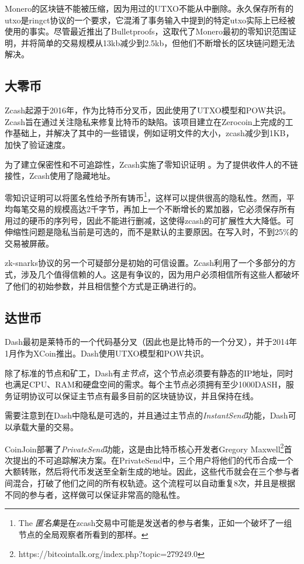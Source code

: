 \documentclass[8pt,fleqn,openany]{book}
\begin{document}
\begin{CJK*}{UTF8}{gbsn}
{Monero的区块链不能被压缩，因为用过的UTXO不能从中删除。永久保存所有的utxo是ringct协议的一个要求，它混淆了事务输入中提到的特定utxo实际上已经被使用的事实。尽管最近推出了Bulletproofs\cite{c4}，这取代了Monero最初的零知识范围证明，并将简单的交易规模从13kb减少到2.5kb，但他们不断增长的区块链问题无法解决。


\subsection{大零币} Zcash起源于2016年，作为比特币分叉币，因此使用了UTXO模型和POW共识。Zcash旨在通过关注隐私来修复比特币的缺陷。该项目建立在Zerocoin\cite{c5}上完成的工作基础上，并解决了其中的一些错误，例如证明文件的大小，zcash减少到1KB，加快了验证速度。

为了建立保密性和不可追踪性，Zcash实施了零知识证明 \cite{c6}。为了提供收件人的不链接性，Zcash使用了隐藏地址。

零知识证明可以将匿名性给予所有铸币\footnote{The \textit{匿名集}是在zcash交易中可能是发送者的参与者集，正如一个破坏了一组节点的全局观察者所看到的那样。}，这样可以提供很高的隐私性。然而，平均每笔交易的规模高达2千字节，再加上一个不断增长的累加器，它必须保存所有用过的硬币的序列号，因此不能进行删减，这使得zcash的可扩展性大大降低。可伸缩性问题是隐私当前是可选的，而不是默认的主要原因。在写入时，不到25\%的交易被屏蔽。

zk-snarks协议的另一个可疑部分是初始的可信设置。Zcash利用了一个多部分的方式，涉及几个值得信赖的人。这是有争议的，因为用户必须相信所有这些人都破坏了他们的初始参数，并且相信整个方式是正确进行的。

\subsection{达世币} Dash最初是莱特币的一个代码基分叉（因此也是比特币的一个分叉），并于2014年1月作为XCoin推出。Dash使用UTXO模型和POW共识。

除了标准的节点和矿工，Dash有\textit{主节点}，这个节点必须要有静态的IP地址，同时也满足CPU、RAM和硬盘空间的需求。每个主节点必须拥有至少1000DASH，服务证明协议可以保证主节点有最多目前的区块链协议，并且保持在线。

需要注意到在Dash中隐私是可选的，并且通过主节点的\textit{InstantSend}功能，Dash可以承载大量的交易。

CoinJoin部署了\textit{PrivateSend}功能，这是由比特币核心开发者Gregory Maxwell\footnote{https://bitcointalk.org/index.php?topic=279249.0}首次提出的不可追踪解决方案。在PrivateSend中，三个用户将他们的代币合成一个大额转账，然后将代币发送至全新生成的地址。因此，这些代币就会在三个参与者间混合，打破了他们之间的所有权轨迹。这个流程可以自动重复8次，并且是根据不同的参与者，这样做可以保证非常高的隐私性。

}
\end{CJK*}
\end{document}
